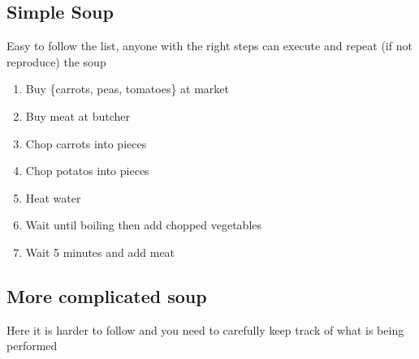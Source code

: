 \documentclass[letterpaper,10pt,english]{sphinxmanual}
\begin{document}
\subsection{Simple Soup}
\label{\detokenize{01-Introduction:simple-soup}}
\sphinxAtStartPar
Easy to follow the list, anyone with the right steps can execute and repeat (if not reproduce) the soup
\begin{enumerate}
%
\item {} 
\sphinxAtStartPar
Buy \{carrots, peas, tomatoes\} at market

\item {} 
\sphinxAtStartPar
{} Buy meat at butcher

\item {} 
\sphinxAtStartPar
{} Chop carrots into pieces

\item {} 
\sphinxAtStartPar
{} Chop potatos into pieces

\item {} 
\sphinxAtStartPar
{} Heat water

\item {} 
\sphinxAtStartPar
{} Wait until boiling then add chopped vegetables

\item {} 
\sphinxAtStartPar
{} Wait 5 minutes and add meat

\end{enumerate}


\subsection{More complicated soup}
\label{\detokenize{01-Introduction:more-complicated-soup}}
\sphinxAtStartPar
Here it is harder to follow and you need to carefully keep track of what is being performed
\end{document}
